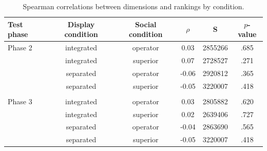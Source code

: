 \documentclass[doc, a4paper, apacite]{apa6}
\begin{document}
\begin{table}
	\centering
	\caption{Spearman correlations between dimensions and rankings by condition.}
	\label{table:spearmanCorrelations}
	\begin{tabular}{l c c c c c}
	\toprule
	Test phase & Display condition & Social condition & $\rho$ & S & $p$-value \\
	\midrule
	Phase 2 & integrated & operator & 0.03 & 2855266 & .685 \\
	& integrated & superior & 0.07 & 2728527 & .271 \\
	& separated & operator & -0.06 & 2920812 & .365 \\
	& separated & superior & -0.05 & 3220007 & .418 \\
	\\
	Phase 3 & integrated & operator & 0.03 & 2805882 & .620 \\
	& integrated & superior & 0.02 & 2639406 & .727 \\
	& separated & operator & -0.04 & 2863690 & .565 \\
	& separated & superior & -0.05 & 3220007 & .418 \\
	\bottomrule
	\end{tabular}
\end{table}


\clearpage
\newpage


\end{document}
